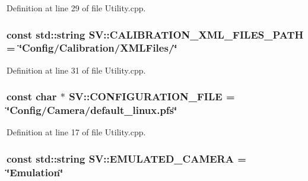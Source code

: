 Definition at line 29 of file Utility.\-cpp.

\hypertarget{namespace_s_v_a08efa5f4f7f6a650b132fe6ce146c7a6}{
\subsubsection[{C\-A\-L\-I\-B\-R\-A\-T\-I\-O\-N\-\_\-\-X\-M\-L\-\_\-\-F\-I\-L\-E\-S\-\_\-\-P\-A\-T\-H}]{\setlength{\rightskip}{0pt plus 5cm}const std\-::string S\-V\-::\-C\-A\-L\-I\-B\-R\-A\-T\-I\-O\-N\-\_\-\-X\-M\-L\-\_\-\-F\-I\-L\-E\-S\-\_\-\-P\-A\-T\-H = \char`\"{}Config/Calibration/X\-M\-L\-Files/\char`\"{}}}\label{namespace_s_v_a08efa5f4f7f6a650b132fe6ce146c7a6}


Definition at line 31 of file Utility.\-cpp.

\hypertarget{namespace_s_v_aa00fc841744191453046361becae6ae6}{
\subsubsection[{C\-O\-N\-F\-I\-G\-U\-R\-A\-T\-I\-O\-N\-\_\-\-F\-I\-L\-E}]{\setlength{\rightskip}{0pt plus 5cm}const char $\ast$ S\-V\-::\-C\-O\-N\-F\-I\-G\-U\-R\-A\-T\-I\-O\-N\-\_\-\-F\-I\-L\-E = \char`\"{}Config/Camera/default\-\_\-linux.\-pfs\char`\"{}}}\label{namespace_s_v_aa00fc841744191453046361becae6ae6}


Definition at line 17 of file Utility.\-cpp.

\hypertarget{namespace_s_v_ab43026f6f6ee1b8e5cc36194a2ea9e6b}{
\subsubsection[{E\-M\-U\-L\-A\-T\-E\-D\-\_\-\-C\-A\-M\-E\-R\-A}]{\setlength{\rightskip}{0pt plus 5cm}const std\-::string S\-V\-::\-E\-M\-U\-L\-A\-T\-E\-D\-\_\-\-C\-A\-M\-E\-R\-A = \char`\"{}Emulation\char`\"{}}}\label{namespace_s_v_ab43026f6f6ee1b8e5cc36194a2ea9e6b}


